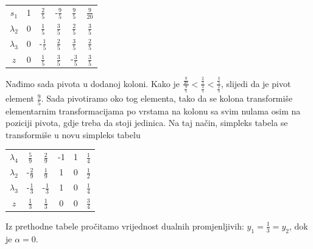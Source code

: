 \documentclass[a4paper, utf8, 11pt, colorlinks]{book}
\theoremstyle{definition}
\begin{document}
\begin{center}
	
	\begin{tabular}{c|cccc|c}\vspace{1mm}
		$s_1$	    &   1      &    $\frac{2}{5}$          &   -$\frac{9}{5}$       &  $\frac{9}{5} $        &  $\frac{9}{20}$ \\\vspace{1mm}
		$\lambda_2$  &   0      &    $\frac{1}{5}$         &   $\frac{3}{5}$        &   $\frac{2}{5}$        &  $\frac{3}{5}$             \\\vspace{1mm}
		$\lambda_3$  &   0      &    -$\frac{1}{5}$        &   $\frac{2}{5}$        &   $\frac{3}{5}$         &  $\frac{2}{5}$            \\ \hline\vspace{1mm}
		$z$          &   0      &    $\frac{1}{5}$         &  $ \frac{3}{5}$        &   -$\frac{3}{5}$         & $\frac{3}{5}$
	\end{tabular}
	
\end{center} 
Nađimo sada pivota u dodanoj koloni. Kako je $\frac{\frac{9}{20}}{\frac95} < \frac{\frac25}{\frac35}< \frac{\frac35}{\frac25}$, slijedi da je pivot element $\frac{9}{5}$.  Sada pivotiramo oko tog elementa, tako da se kolona transformiše elementarnim transformacijama po vrstama na kolonu sa svim nulama osim na poziciji pivota, gdje treba da stoji jedinica. Na taj način, simpleks tabela se transformiše u novu simpleks tabelu 
\begin{center}
	
	\begin{tabular}{c|cccc|c}\vspace{1mm}
		$\lambda_4$	 &   $\frac{5}{9}$      &    $\frac{2}{9}$          &   -1       &  1      &  $\frac{1}{4}$ \\\vspace{1mm}
		$\lambda_2$  &   -$\frac{2}{9}$    &   $\frac{1}{9}$        &   1        &   0         &  $\frac{1}{2}$        \\\vspace{1mm}
	    $\lambda_3$  &  -$\frac{1}{3}$     &    -$\frac{1}{3}$      &   1        &   0        &  $\frac{1}{4}$      
		    \\ \hline\vspace{1mm}
		$z$          &   $\frac{1}{3}$     &    $\frac{1}{3}$         &  $0$        &  0         & $\frac{3}{4}$
	\end{tabular}
	
\end{center} 
Iz prethodne tabele pročitamo vrijednost dualnih promjenljivih: $y_1 =  \frac{1}{3}=y_2$, dok je $\alpha=0$. 
\end{document}
